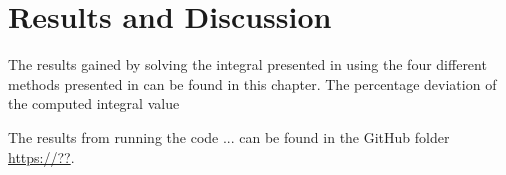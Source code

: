 \chapter{Results and Discussion}
\label{chap:Results}
The results gained by solving the integral presented in  using the four different methods presented in  can be found in this chapter. 
The percentage deviation of the computed integral value 

The results from running the code ... can be found in the GitHub folder  \url{https://??}.
